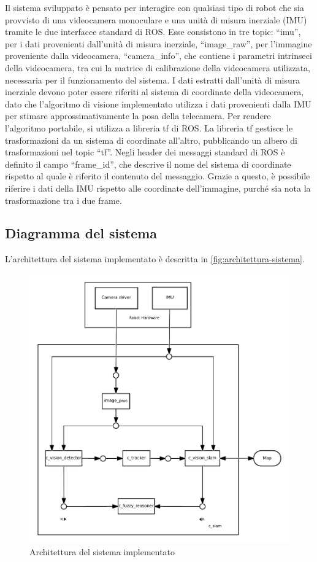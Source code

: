 Il sistema sviluppato è pensato per interagire con qualsiasi tipo di robot che sia provvisto di una videocamera monoculare e una unità di misura inerziale (IMU) tramite le due interfacce standard di ROS.
Esse consistono in tre topic: ``imu'', per i dati provenienti dall'unità di misura inerziale, ``image\_raw'', per l'immagine proveniente dalla videocamera, ``camera\_info'', che contiene i parametri intrinseci della videocamera, tra cui la matrice di calibrazione della videocamera utilizzata, necessaria per il funzionamento del sistema.
I dati estratti dall'unità di misura inerziale devono poter essere riferiti al sistema di coordinate della videocamera, dato che l'algoritmo di visione implementato utilizza i dati provenienti dalla IMU per stimare approssimativamente la posa della telecamera.
Per rendere l'algoritmo portabile, si utilizza a libreria tf di ROS. La libreria tf gestisce le trasformazioni da un sistema di coordinate all'altro, pubblicando un albero di trasformazioni nel topic ``tf''.
Negli header dei messaggi standard di ROS è definito il campo ``frame\_id'', che descrive il nome del sistema di coordinate rispetto al quale è riferito il contenuto del messaggio. Grazie a questo, è possibile riferire i dati della IMU rispetto alle coordinate dell'immagine, purché sia nota la trasformazione tra i due frame.

\subsection{Diagramma del sistema}

L'architettura del sistema implementato è descritta in \autoref{fig:architettura-sistema}. \\
\begin{figure}[ht]
  \includegraphics[width=\textwidth]{diagrammi/Sistema}
  \caption{Architettura del sistema implementato}
  \label{fig:architettura-sistema}
\end{figure}


